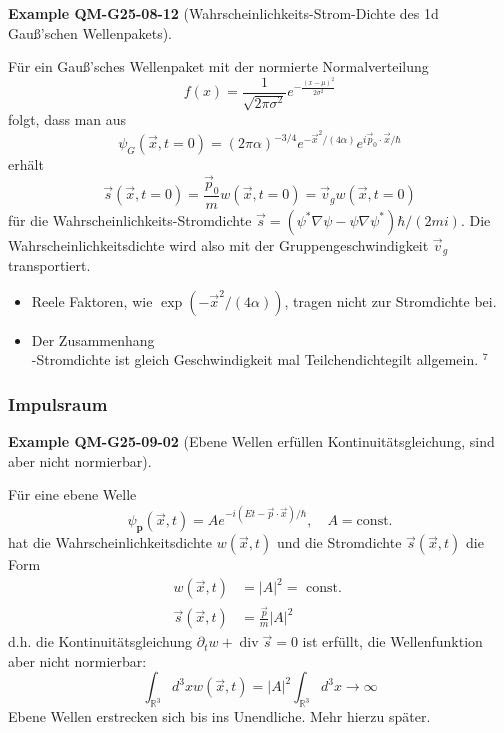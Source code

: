 \documentclass[10pt, letterpaper]{article}
\newcommand{\CustomHeading}[3]{%
  \par\medskip\noindent%
  \textbf{#1 #2} \textnormal{(#3)}.\enskip%
}
\newenvironment{EXA}[2]{\begin{unitbox}\CustomHeading{Example}{#1}{#2}}{\end{unitbox}}
\begin{document}
\begin{EXA}{QM-G25-08-12}{Wahrscheinlichkeits-Strom-Dichte des 1d Gauß'schen Wellenpakets}
Für ein Gauß'sches Wellenpaket mit der normierte Normalverteilung
$$f(x)=\frac{1}{\sqrt{2 \pi \sigma^{2}}} e^{-\frac{(x-\mu)^{2}}{2 \sigma^{2}}}$$
folgt, dass man aus
$$
\psi_{G}(\vec{x}, t=0)=(2 \pi \alpha)^{-3 / 4} e^{-\vec{x}^{2} /(4 \alpha)} e^{i \vec{p}_{0} \cdot \vec{x} / \hbar}
$$
erhält
$$
\vec{s}(\vec{x}, t=0)=\frac{\vec{p}_{0}}{m} w(\vec{x}, t=0)=\vec{v}_{g} w(\vec{x}, t=0)
$$
für die Wahrscheinlichkeits-Stromdichte $\vec{s}=\left(\psi^{*} \nabla \psi-\psi \nabla \psi^{*}\right) \hbar /(2 m i)$. Die Wahrscheinlichkeitsdichte wird also mit der Gruppengeschwindigkeit $\vec{v}_{g}$ transportiert.

\begin{itemize}
  \item Reele Faktoren, wie $\exp \left(-\vec{x}^{2} /(4 \alpha)\right)$, tragen nicht zur Stromdichte bei.
  \item Der Zusammenhang\\
-Stromdichte ist gleich Geschwindigkeit mal Teilchendichtegilt allgemein. ${ }^{7}$
\end{itemize}
\end{EXA}






\subsubsection{Impulsraum}


\begin{EXA}{QM-G25-09-02}{Ebene Wellen erfüllen Kontinuitätsgleichung, sind aber nicht normierbar}
Für eine ebene Welle
$$
\psi_{\mathbf{p}}(\vec{x}, t)=A e^{-i(E t-\vec{p} \cdot \vec{x}) / \hbar}, \quad A=\mathrm{const} .
$$
hat die Wahrscheinlichkeitsdichte $w(\vec{x}, t)$ und die Stromdichte $\vec{s}(\vec{x}, t)$ die Form
$$
\begin{aligned}
w(\vec{x}, t) & =|A|^{2}=\text { const. } \\
\vec{s}(\vec{x}, t) & =\frac{\vec{p}}{m}|A|^{2}
\end{aligned}
$$
d.h. die Kontinuitätsgleichung $\partial_{t} w+\operatorname{div} \vec{s}=0$ ist erfüllt, die Wellenfunktion aber nicht normierbar:
$$
\int_{\mathbb{R}^{3}} d^{3} x w(\vec{x}, t)=|A|^{2} \int_{\mathbb{R}^{3}} d^{3} x \rightarrow \infty
$$
Ebene Wellen erstrecken sich bis ins Unendliche. Mehr hierzu später.
\end{EXA}
\end{document}
